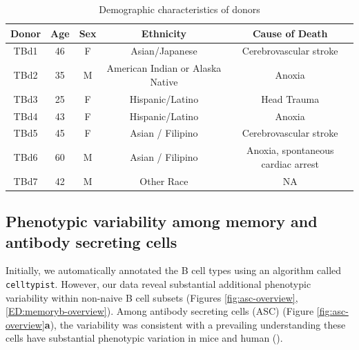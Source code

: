 \begin{table}[t]
\centering
\begin{tabular}{|c|c|c|c|c|}
\hline
\textbf{Donor} & \textbf{Age} & \textbf{Sex} & \textbf{Ethnicity} & \textbf{Cause of Death} \\
\hline
TBd1 & 46 & F & Asian/Japanese & Cerebrovascular stroke \\
TBd2 & 35 & M & American Indian or Alaska Native & Anoxia \\
TBd3 & 25 & F & Hispanic/Latino & Head Trauma \\
TBd4 & 43 & F & Hispanic/Latino & Anoxia \\
TBd5 & 45 & F & Asian / Filipino & Cerebrovascular stroke  \\
TBd6 & 60 & M & Asian / Filipino & Anoxia, spontaneous cardiac arrest \\
TBd7 & 42 & M & Other Race & NA \\
\hline
\end{tabular}
    \caption[Table of Donor Metadata]{Demographic characteristics of  donors}

    \label{tab:donor-metadata}
\end{table}

\subsection{Phenotypic variability among memory and antibody secreting cells}



Initially, we automatically annotated the B cell types using an algorithm called \verb|celltypist|\cite{dominguez2022cross}. However, our data reveal substantial additional phenotypic variability within non-naive B cell subsets (Figures \ref{fig:asc-overview}, \ref{ED:memoryb-overview}). Among antibody secreting cells (ASC) (Figure \ref{fig:asc-overview}\textbf{a}), the variability was consistent with a prevailing understanding these cells have substantial phenotypic variation in mice and human (\cite{tarlinton2023making, halliley2015long}). 

